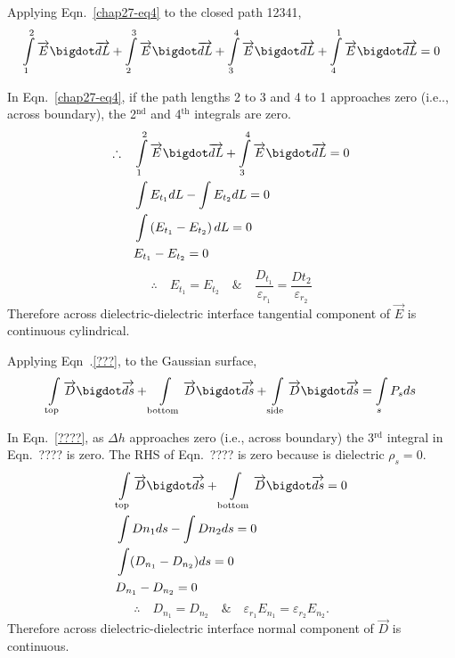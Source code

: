 Applying Eqn.~\eqref{chap27-eq4} to the closed path 12341,
\begin{equation*}
\int\limits_{1}^{2} \overrightarrow{E} \bigdot \overrightarrow{dL} + \int\limits_{2}^{3} \overrightarrow{E} \bigdot \overrightarrow{dL} + \int\limits_{3}^{4} \overrightarrow{E} \bigdot \overrightarrow{dL} + \int\limits_{4}^{1} \overrightarrow{E} \bigdot \overrightarrow{dL} = 0\label{chap27-eq4}
\end{equation*}

In Eqn.~\eqref{chap27-eq4}, if the path lengths 2 to 3 and 4 to 1 approaches zero (i.e.., across boundary), the 2$^{\text{nd}}$ and 4$^{\text{th}}$ integrals are zero. 
\begin{align*}
\therefore\quad  &\int\limits_{1}^{2} \overrightarrow{E} \bigdot \overrightarrow{dL} + \int\limits_{3}^{4} \overrightarrow{E} \bigdot \overrightarrow{dL} = 0\\
 & \int E_{t_{1}}dL - \int E_{t_{2}}dL  = 0\\
 & \int \left(E_{t_{1}} - E_{t_{2}}\right)dL  = 0\\
 & E_{t_{1}} - E_{t_{2}} = 0
\end{align*} 
$$
\therefore\quad E_{t_{1}} = E_{t_{2}} \quad\text{\&}\quad \dfrac{D_{t_{1}}}{\varepsilon_{r_{1}}} = \dfrac{Dt_{2}}{\varepsilon_{r_{2}}}
$$
Therefore across dielectric-dielectric interface 
tangential component of $\overrightarrow{E}$ is continuous cylindrical. 

Applying Eqn~.\eqref{???}, to the Gaussian surface, 
\begin{equation*}
\int\limits_{\text{top}} \overrightarrow{D} \bigdot \overrightarrow{ds} + \int\limits_{\text{bottom}} \overrightarrow{D} \bigdot \overrightarrow{ds} + \int\limits_{\text{side}} \overrightarrow{D} \bigdot \overrightarrow{ds} = \int\limits_{s} P_{s}ds\label{chap27-eq27.5}
\end{equation*}

In Eqn.~\eqref{????}, as $\Delta h$ approaches zero (i.e., across boundary) the 3$^{\text{rd}}$ integral in Eqn.~???? is zero. The RHS of Eqn.~???? is zero because is dielectric $\rho_{s} = 0$.
\begin{align*}
& \int\limits_{\text{top}} \overrightarrow{D} \bigdot \overrightarrow{ds} + \int\limits_{\text{bottom}} \overrightarrow{D} \bigdot \overrightarrow{ds} = 0\\
& \int Dn_{1}ds - \int Dn_{2}ds  = 0\\
& \int (D_{n_{1}} - D_{n_{2}})ds = 0\\
& D_{n_{1}} - D_{n_{2}}  = 0
\end{align*}
$$
\therefore\quad  D_{n_{1}} = D_{n_{2}}  \quad\text{\&}\quad \varepsilon_{r_{1}}E_{n_{1}} = \varepsilon_{r_{2}}E_{n_{2}}. 
$$
Therefore across dielectric-dielectric interface normal component of $\overrightarrow{D}$ is continuous. 

